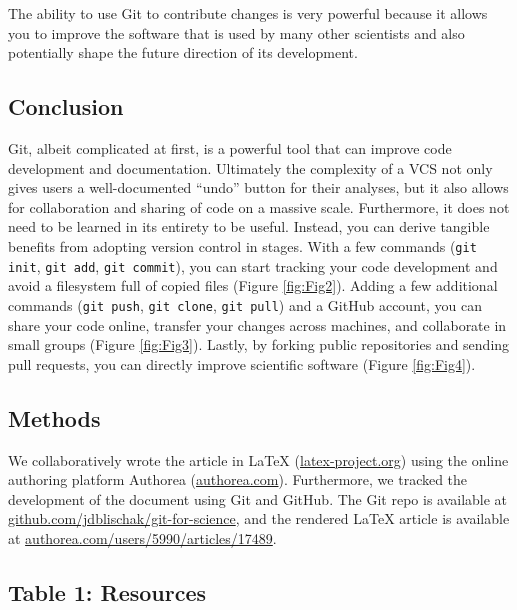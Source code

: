 \documentclass[10pt]{article}
\begin{document}
The ability to use Git to contribute changes is very powerful because it allows you to improve the software that is used by many other scientists and also potentially shape the future direction of its development.


\subsection{Conclusion}

Git, albeit complicated at first, is a powerful tool that can improve code development and documentation.
Ultimately the complexity of a VCS not only gives users a well-documented ``undo'' button for their analyses, but it also allows for collaboration and sharing of code on a massive scale.
Furthermore, it does not need to be learned in its entirety to be useful.
Instead, you can derive tangible benefits from adopting version control in stages.
With a few commands (\verb|git init|, \verb|git add|, \verb|git commit|), you can start tracking your code development and avoid a filesystem full of copied files (Figure \ref{fig:Fig2}).
Adding a few additional commands (\verb|git push|, \verb|git clone|, \verb|git pull|) and a GitHub account, you can share your code online, transfer your changes across machines, and collaborate in small groups (Figure \ref{fig:Fig3}).
Lastly, by forking public repositories and sending pull requests, you can directly improve scientific software (Figure \ref{fig:Fig4}).


\subsection{Methods}

We collaboratively wrote the article in LaTeX (\href{http://www.latex-project.org/}{latex-project.org}) using the online authoring platform Authorea (\href{https://www.authorea.com}{authorea.com}).
Furthermore, we tracked the development of the document using Git and GitHub.
The Git repo is available at \href{https://github.com/jdblischak/git-for-science}{github.com/jdblischak/git-for-science}, and the rendered LaTeX article is available at \href{https://www.authorea.com/users/5990/articles/17489}{authorea.com/users/5990/articles/17489}.

\subsection{Table 1: Resources}
\end{document}
